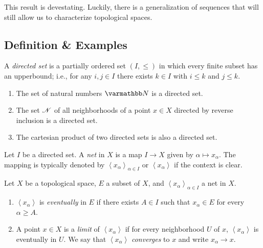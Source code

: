 This result is devestating. Luckily, there is a generalization of sequences that will still allow us to characterize topological spaces.

\subsection{Definition \& Examples}

\begin{definition}
	A \emph{directed set} is a partially ordered set $(I,\leq)$ in which every finite subset has an upperbound; i.e., for any $i,j \in I$ there exists $k \in I$ with $i \leq k$ and $j \leq k$.
\end{definition}

\begin{example}
	\mbox{}
	\begin{enumerate}[label = (\arabic*),itemsep=1pt,topsep=3pt]
		\item The set of natural numbers $\bfN$ is a directed set.
		\item The set $\mathscr{N}$ of all neighborhoods of a point $x \in X$ directed by reverse inclusion is a directed set.
		\item The cartesian product of two directed sets is also a directed set.
	\end{enumerate}
\end{example}

\begin{definition}
	Let $I$ be a directed set. A \emph{net} in $X$ is a map  $I \rightarrow X$ given by $\alpha \mapsto x_\alpha$. The mapping is typically denoted by $\left<x_\alpha \right>_{\alpha \in I}$ or $\left<x_\alpha \right>$ if the context is clear.
\end{definition}

\begin{definition}
	Let $X$ be a topological space, $E$ a subset of $X$, and $\left<x_\alpha \right>_{\alpha \in I}$ a net in $X$.
	\mbox{}
	\begin{enumerate}[label = (\arabic*),itemsep=1pt,topsep=3pt]
		\item $\left<x_\alpha \right>$ is \emph{eventually} in $E$ if there exists $A \in I$ such that $x_\alpha \in E$ for every $\alpha \geq A$.
		\item A point $x \in X$ is a \emph{limit} of $\left<x_\alpha \right>$ if for every neighborhood $U$ of $x$, $\left<x_\alpha \right>$ is eventually in $U$. We say that $\left<x_\alpha \right>$ \emph{converges} to $x$ and write $x_\alpha \rightarrow x$.
	\end{enumerate}
\end{definition}

